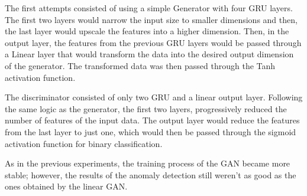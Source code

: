 The first attempts consisted of using a simple Generator with four GRU layers. The first two layers would narrow the input size to smaller dimensions and then, the last layer would upscale the features into a higher dimension. Then, in the output layer, the features from the previous GRU layers would be passed through a Linear layer that would transform the data into the desired output dimension of the generator. The transformed data was then passed through the Tanh activation function. 

The discriminator consisted of only two GRU and a linear output layer. Following the same logic as the generator, the first two layers, progressively reduced the number of features of the input data. The output layer would reduce the features from the last layer to just one, which would then be passed through the sigmoid activation function for binary classification.

As in the previous experiments, the training process of the GAN became more stable; however, the results of the anomaly detection still weren't as good as the ones obtained by the linear GAN.








